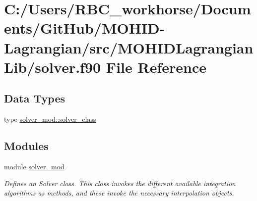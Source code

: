 \hypertarget{solver_8f90}{}\section{C\+:/\+Users/\+R\+B\+C\+\_\+workhorse/\+Documents/\+Git\+Hub/\+M\+O\+H\+I\+D-\/\+Lagrangian/src/\+M\+O\+H\+I\+D\+Lagrangian\+Lib/solver.f90 File Reference}
\label{solver_8f90}
\subsection*{Data Types}
\begin{DoxyCompactItemize}
\item 
type \mbox{\hyperlink{structsolver__mod_1_1solver__class}{solver\+\_\+mod\+::solver\+\_\+class}}
\end{DoxyCompactItemize}
\subsection*{Modules}
\begin{DoxyCompactItemize}
\item 
module \mbox{\hyperlink{namespacesolver__mod}{solver\+\_\+mod}}
\begin{DoxyCompactList}\small\item\em Defines an Solver class. This class invokes the different available integration algorithms as methods, and these invoke the necessary interpolation objects. \end{DoxyCompactList}\end{DoxyCompactItemize}
